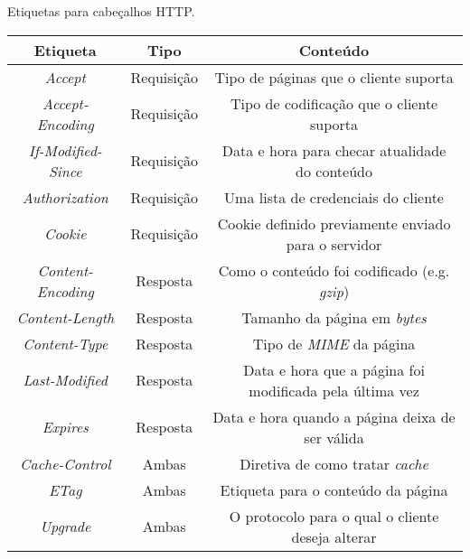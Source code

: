\begin{quadro}[!htb]
	\centering
	\caption{Etiquetas para cabeçalhos HTTP.\label{qua:cabecalhoshttp}}
	\begin{tabular}{| c | c | c |}
		\hline
		\textbf{Etiqueta} & \textbf{Tipo} & \textbf{Conteúdo}                                       \\
		\hline
		\textit{Accept}             & Requisição    & Tipo de páginas que o cliente suporta                   \\
		\hline
		\textit{Accept-Encoding}    & Requisição    & Tipo de codificação que o cliente suporta               \\
		\hline
		\textit{If-Modified-Since}  & Requisição    & Data e hora para checar atualidade do conteúdo          \\
		\hline
		\textit{Authorization}      & Requisição    & Uma lista de credenciais do cliente                      \\
		\hline
		\textit{Cookie}             & Requisição    & Cookie definido previamente enviado para o servidor     \\
		\hline
		\textit{Content-Encoding}   & Resposta      & Como o conteúdo foi codificado (e.g. \textit{gzip})               \\
		\hline
		\textit{Content-Length}     & Resposta      & Tamanho da página em \textit{bytes}                              \\
		\hline
		\textit{Content-Type}       & Resposta      & Tipo de \textit{MIME} da página                                  \\
		\hline
		\textit{Last-Modified}      & Resposta      & Data e hora que a página foi modificada pela última vez \\
		\hline
		\textit{Expires}            & Resposta      & Data e hora quando a página deixa de ser válida         \\
		\hline
		\textit{Cache-Control}      & Ambas          & Diretiva de como tratar \textit{cache}                           \\
		\hline
		\textit{ETag}               & Ambas          & Etiqueta para o conteúdo da página                      \\
		\hline
		\textit{Upgrade}            & Ambas          & O protocolo para o qual o cliente deseja alterar        \\	
		\hline
	\end{tabular}
\end{quadro}